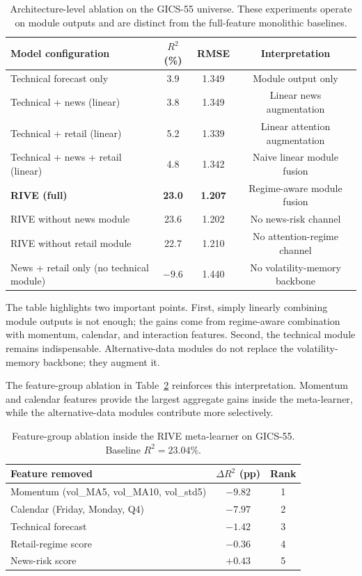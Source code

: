 \documentclass[review]{elsarticle}
\begin{document}
\begin{table}[H]
\centering
\caption{Architecture-level ablation on the GICS-55 universe. These experiments operate on module outputs and are distinct from the full-feature monolithic baselines.}
\label{tab:ablation-arch}
\begin{tabular}{lccc}
\toprule
Model configuration & $R^2$ (\%) & RMSE & Interpretation \\
\midrule
Technical forecast only & 3.9 & 1.349 & Module output only \\
Technical + news (linear) & 3.8 & 1.349 & Linear news augmentation \\
Technical + retail (linear) & 5.2 & 1.339 & Linear attention augmentation \\
Technical + news + retail (linear) & 4.8 & 1.342 & Naive linear module fusion \\
\textbf{RIVE (full)} & \textbf{23.0} & \textbf{1.207} & Regime-aware module fusion \\
\midrule
RIVE without news module & 23.6 & 1.202 & No news-risk channel \\
RIVE without retail module & 22.7 & 1.210 & No attention-regime channel \\
News + retail only (no technical module) & $-9.6$ & 1.440 & No volatility-memory backbone \\
\bottomrule
\end{tabular}
\end{table}

The table highlights two important points. First, simply linearly combining module outputs is not enough; the gains come from regime-aware combination with momentum, calendar, and interaction features. Second, the technical module remains indispensable. Alternative-data modules do not replace the volatility-memory backbone; they augment it.

The feature-group ablation in Table~\ref{tab:ablation-features} reinforces this interpretation. Momentum and calendar features provide the largest aggregate gains inside the meta-learner, while the alternative-data modules contribute more selectively.

\begin{table}[H]
\centering
\caption{Feature-group ablation inside the RIVE meta-learner on GICS-55. Baseline $R^2=23.04\%$.}
\label{tab:ablation-features}
\begin{tabular}{lcc}
\toprule
Feature removed & $\Delta R^2$ (pp) & Rank \\
\midrule
Momentum (vol\_MA5, vol\_MA10, vol\_std5) & $-9.82$ & 1 \\
Calendar (Friday, Monday, Q4) & $-7.97$ & 2 \\
Technical forecast & $-1.42$ & 3 \\
Retail-regime score & $-0.36$ & 4 \\
News-risk score & $+0.43$ & 5 \\
\bottomrule
\end{tabular}
\end{table}
\end{document}
